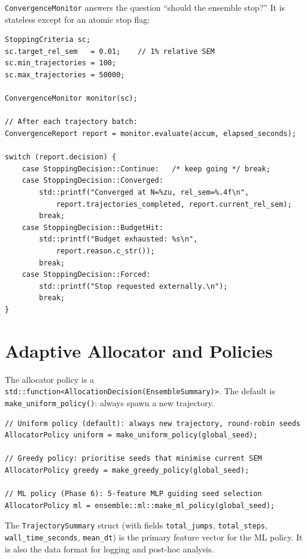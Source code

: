 \documentclass[11pt,a4paper,twoside]{book}
\newcommand{\code}[1]{\texttt{\small#1}}
\theoremstyle{definition}
\theoremstyle{remark}
\begin{document}
\code{ConvergenceMonitor} answers the question ``should the ensemble stop?''
It is stateless except for an atomic stop flag:

\begin{verbatim}
StoppingCriteria sc;
sc.target_rel_sem   = 0.01;    // 1% relative SEM
sc.min_trajectories = 100;
sc.max_trajectories = 50000;

ConvergenceMonitor monitor(sc);

// After each trajectory batch:
ConvergenceReport report = monitor.evaluate(accum, elapsed_seconds);

switch (report.decision) {
    case StoppingDecision::Continue:   /* keep going */ break;
    case StoppingDecision::Converged:
        std::printf("Converged at N=%zu, rel_sem=%.4f\n",
            report.trajectories_completed, report.current_rel_sem);
        break;
    case StoppingDecision::BudgetHit:
        std::printf("Budget exhausted: %s\n",
            report.reason.c_str());
        break;
    case StoppingDecision::Forced:
        std::printf("Stop requested externally.\n");
        break;
}
\end{verbatim}

\section{Adaptive Allocator and Policies}
\label{sec:adaptive-allocator}

The allocator policy is a \code{std::function<AllocationDecision(EnsembleSummary)>}.
The default is \code{make\_uniform\_policy()}: always spawn a new trajectory.

\begin{verbatim}
// Uniform policy (default): always new trajectory, round-robin seeds
AllocatorPolicy uniform = make_uniform_policy(global_seed);

// Greedy policy: prioritise seeds that minimise current SEM
AllocatorPolicy greedy = make_greedy_policy(global_seed);

// ML policy (Phase 6): 5-feature MLP guiding seed selection
AllocatorPolicy ml = ensemble::ml::make_ml_policy(global_seed);
\end{verbatim}

The \code{TrajectorySummary} struct (with fields \code{total\_jumps},
\code{total\_steps}, \code{wall\_time\_seconds}, \code{mean\_dt})
is the primary feature vector for the ML policy. It is also the
data format for logging and post-hoc analysis.
\end{document}
